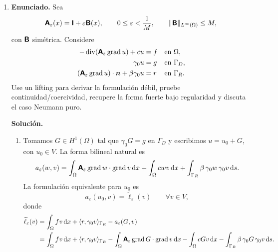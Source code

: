 \documentclass[11pt]{article}
\def\mat   #1{\mbox{\boldmath $\mathsf #1$}}
\def\vec   #1{\mbox{\boldmath $#1$}{}}
\DeclareMathOperator{\grad}{grad}
\DeclareMathOperator{\dive}{div}
\def\dx{\mbox{\(\,\mathrm{d}x\)}}
\def\ds{\mbox{\(\,\mathrm{d}s\)}}
\begin{document}
\begin{enumerate}[label=\textbf{\arabic*.}, leftmargin=*]
\begin{enumerate}[label=(\alph*)]
        \item Si $u_h=\sum_{j=1}^N U_j\varphi_j$, entonces
        \[
            \sum_{j=1}^N a(\varphi_j,\varphi_i)U_j=\ell(\varphi_i),
            \qquad i=1,\dots,N.
        \]
        En forma matricial,
        \[
            \mat A\vec U=\vec F,
            \qquad
            A_{ij}=a(\varphi_j,\varphi_i),
            \qquad
            F_i=\ell(\varphi_i).
        \]
    \end{enumerate}

    \item \textbf{Enunciado.} Sea
    \[
        \mat A_\varepsilon(x)=\mat I+\varepsilon\mat B(x),
        \qquad
        0\le\varepsilon<\frac1M,\qquad
        \|\mat B\|_{L^\infty(\Omega)}\le M,
    \]
    con $\mat B$ simétrica. Considere
    \[
    \begin{aligned}
        -\dive(\mat A_\varepsilon\grad u)+cu&=f &&\text{en }\Omega,\\
        \gamma_0u&=g &&\text{en }\Gamma_D,\\
        (\mat A_\varepsilon\grad u)\cdot\vec n+\beta\gamma_0u&=r &&\text{en }\Gamma_R.
    \end{aligned}
    \]
    Use un lifting para derivar la formulación débil, pruebe continuidad/coercividad, recupere la forma fuerte bajo regularidad y discuta el caso Neumann puro.

    \textbf{Solución.}
    \begin{enumerate}[label=(\alph*)]
        \item Tomamos $G\in H^1(\Omega)$ tal que $\gamma_0G=g$ en $\Gamma_D$ y escribimos $u=u_0+G$, con $u_0\in V$. La forma bilineal natural es
        \[
            a_\varepsilon(w,v)=
            \int_\Omega \mat A_\varepsilon\grad w\cdot\grad v\dx
            +\int_\Omega cwv\dx
            +\int_{\Gamma_R}\beta\,\gamma_0w\,\gamma_0v\ds.
        \]
        La formulación equivalente para $u_0$ es
        \[
            a_\varepsilon(u_0,v)=\widetilde\ell_\varepsilon(v)
            \qquad\forall v\in V,
        \]
        donde
        \[
        \begin{aligned}
            \widetilde\ell_\varepsilon(v)
            &=
            \int_\Omega fv\dx
            +\langle r,\gamma_0v\rangle_{\Gamma_R}
            -a_\varepsilon(G,v)\\
            &=
            \int_\Omega fv\dx
            +\langle r,\gamma_0v\rangle_{\Gamma_R}
            -\int_\Omega \mat A_\varepsilon\grad G\cdot\grad v\dx
            -\int_\Omega cGv\dx
            -\int_{\Gamma_R}\beta\,\gamma_0G\,\gamma_0v\ds.
        \end{aligned}
        \]


\end{enumerate}
\end{enumerate}
\end{document}
